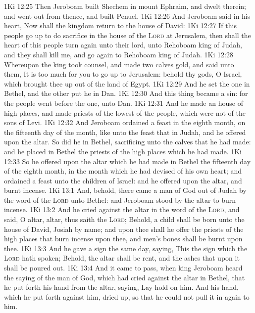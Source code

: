 \vs 1Ki 12:25 Then Jeroboam built Shechem in mount Ephraim, and dwelt therein; and went out from thence, and built Penuel.
\vs 1Ki 12:26 And Jeroboam said in his heart, Now shall the kingdom return to the house of David:
\vs 1Ki 12:27 If this people go up to do sacrifice in the house of the \textsc{Lord} at Jerusalem, then shall the heart of this people turn again unto their lord,  unto Rehoboam king of Judah, and they shall kill me, and go again to Rehoboam king of Judah.
\vs 1Ki 12:28 Whereupon the king took counsel, and made two calves  gold, and said unto them, It is too much for you to go up to Jerusalem: behold thy gods, O Israel, which brought thee up out of the land of Egypt.
\vs 1Ki 12:29 And he set the one in Bethel, and the other put he in Dan.
\vs 1Ki 12:30 And this thing became a sin: for the people went  before the one,  unto Dan.
\vs 1Ki 12:31 And he made an house of high places, and made priests of the lowest of the people, which were not of the sons of Levi.
\vs 1Ki 12:32 And Jeroboam ordained a feast in the eighth month, on the fifteenth day of the month, like unto the feast that  in Judah, and he offered upon the altar. So did he in Bethel, sacrificing unto the calves that he had made: and he placed in Bethel the priests of the high places which he had made.
\vs 1Ki 12:33 So he offered upon the altar which he had made in Bethel the fifteenth day of the eighth month,  in the month which he had devised of his own heart; and ordained a feast unto the children of Israel: and he offered upon the altar, and burnt incense.
\vs 1Ki 13:1 And, behold, there came a man of God out of Judah by the word of the \textsc{Lord} unto Bethel: and Jeroboam stood by the altar to burn incense.
\vs 1Ki 13:2 And he cried against the altar in the word of the \textsc{Lord}, and said, O altar, altar, thus saith the \textsc{Lord}; Behold, a child shall be born unto the house of David, Josiah by name; and upon thee shall he offer the priests of the high places that burn incense upon thee, and men's bones shall be burnt upon thee.
\vs 1Ki 13:3 And he gave a sign the same day, saying, This  the sign which the \textsc{Lord} hath spoken; Behold, the altar shall be rent, and the ashes that  upon it shall be poured out.
\vs 1Ki 13:4 And it came to pass, when king Jeroboam heard the saying of the man of God, which had cried against the altar in Bethel, that he put forth his hand from the altar, saying, Lay hold on him. And his hand, which he put forth against him, dried up, so that he could not pull it in again to him.
